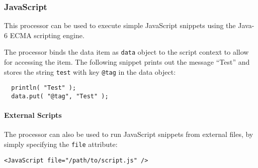 \subsubsection{JavaScript}

This processor can be used to execute simple JavaScript snippets using
the Java-6 ECMA scripting engine.

The processor binds the data item as \texttt{data} object to the script
context to allow for accessing the item. The following snippet prints
out the message ``Test'' and stores the string \texttt{test} with key
\texttt{@tag} in the data object:

\begin{verbatim}
  println( "Test" );
  data.put( "@tag", "Test" );
\end{verbatim}
\paragraph{External Scripts}

The processor can also be used to run JavaScript snippets from external
files, by simply specifying the \texttt{file} attribute:

\begin{verbatim}
<JavaScript file="/path/to/script.js" />
\end{verbatim}


\begin{table}[h]
\end{table}
